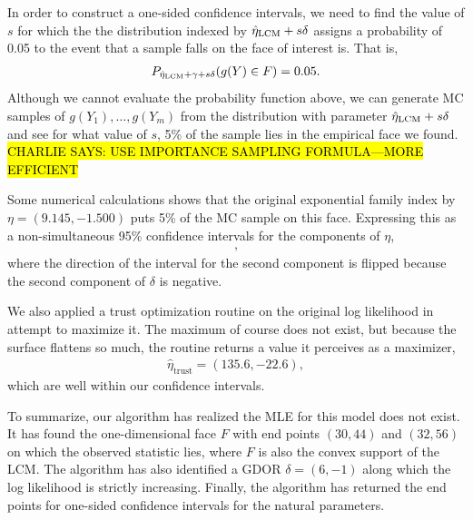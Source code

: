In order to construct a one-sided confidence intervals, we need to find the value of 
$s$ for which the the distribution indexed by $\hat{\eta}_{\textrm{LCM}} + s \delta$ assigns a probability
of 0.05 to the event that a sample falls on the face of interest is.  That is,
\begin{align*}
P_{\hat{\eta}_{\textrm{LCM}} + \gamma + s \delta}(g(Y) \in F ) = 0.05.
\end{align*}
Although we cannot evaluate the probability function above, we can generate MC samples 
of $g(Y_1), \ldots, g(Y_m)$ from the distribution with parameter $\hat{\eta}_{\textrm{LCM}} + s 
\delta$ and see for what value of $s$, 5\% of the sample lies in the 
empirical face we found.  
\hl{CHARLIE SAYS: USE IMPORTANCE SAMPLING FORMULA---MORE EFFICIENT}

Some numerical calculations shows that the original exponential family index by
 $\eta = (9.145, -1.500)$ puts 5\% of the MC sample on this face.  
Expressing this as a non-simultaneous 95\% confidence intervals for the components of $\eta$,
\begin{align*}
	[9.145, +\infty)\\
	(-\infty, -1.500],
\end{align*}
where the direction of the interval for the second component is flipped because the 
second component of $\delta$ is negative.

We also applied a trust optimization routine on the original log 
likelihood in attempt to maximize it.  The maximum of course does not exist, but
because the surface flattens so much, the routine returns a value it perceives as a maximizer,  
\begin{align*}
 	\hat{\eta}_{\textrm{trust}} = (135.6, -22.6),
 \end{align*}
which are well within our confidence intervals.


To summarize, our algorithm has realized the MLE for this model does not exist.
It has found the one-dimensional face $F$ with end points $(30,44)$  
and $(32,56)$ on which the observed statistic lies, where $F$ is also the
convex support of the LCM.  The algorithm has also identified a GDOR $\delta = (6,-1)$
along which the log likelihood is strictly increasing.  Finally, the algorithm 
has returned the end points for one-sided confidence intervals for the natural
parameters.


